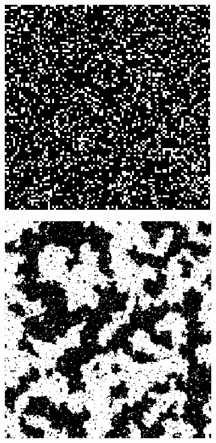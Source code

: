\documentclass[10pt,twoside]{book}
\begin{document}
\begin{figure}
  \centering
  \begin{subfigure}{0.3\textwidth}
     \centering
     \includegraphics[width=\textwidth]{labelImage_pi1Is0pt8}
     \caption{}
     \label{fig:samplesFrommodelBasedSegmentationPriors_a}
  \end{subfigure}
  \hfill
  \begin{subfigure}{0.3\textwidth}
     \centering
     \includegraphics[width=\textwidth]{exampleLabelImage}

\end{subfigure}
\end{figure}
\end{document}
